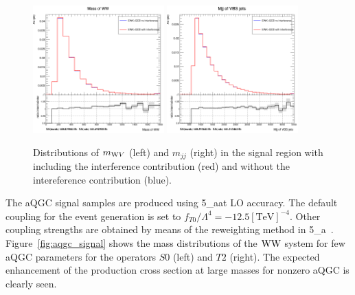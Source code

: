 \begin{figure}[!htbp]
\centering
\includegraphics[width=0.45\textwidth]{Plots/plots/interference_comparison_mww.png}
\includegraphics[width=0.45\textwidth]{Plots/plots/interference_comparison_mjj_vbs.png}
\caption{Distributions of $m_{\mathrm{W} V}$ (left) and $m_{jj}$ (right) in the signal region with including the interference contribution (red) and without the intereference contribution (blue).}
\label{fig:interference}
\end{figure}

The aQGC signal samples are produced using \MADGRAPH{}5\_a\MCATNLO at LO accuracy. The default coupling for the event generation is set to $f_{T0} / \Lambda^{4} = -12.5 [\mathrm{TeV}]^{-4}$. Other coupling strengths are obtained by means of the reweighting method in \MADGRAPH{}5\_a\MCATNLO~\cite{Mattelaer2016,Mattelaer-reweight}. Figure~\ref{fig:aqgc_signal} shows the mass distributions of the  $\mathrm{W} \mathrm{W}$ system for few aQGC parameters for the operators $S0$ (left) and $T2$ (right). The expected enhancement of the production cross section at large masses for nonzero aQGC is clearly seen.      
  
